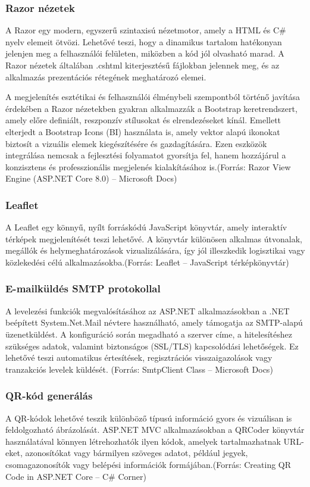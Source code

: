 \subsubsection{Razor nézetek}

\indent A Razor egy modern, egyszerű szintaxisú nézetmotor, amely a HTML és C\# nyelv elemeit ötvözi. Lehetővé teszi, hogy a dinamikus tartalom hatékonyan jelenjen meg a felhasználói felületen, miközben a kód jól olvasható marad. A Razor nézetek általában {.cshtml} kiterjesztésű fájlokban jelennek meg, és az alkalmazás prezentációs rétegének meghatározó elemei.

\indent A megjelenítés esztétikai és felhasználói élménybeli szempontból történő javítása érdekében a Razor nézetekben gyakran alkalmazzák a Bootstrap keretrendszert, amely előre definiált, reszponzív stílusokat és elrendezéseket kínál. Emellett elterjedt a Bootstrap Icons (BI) használata is, amely vektor alapú ikonokat biztosít a vizuális elemek kiegészítésére és gazdagítására. Ezen eszközök integrálása nemcsak a fejlesztési folyamatot gyorsítja fel, hanem hozzájárul a konzisztens és professzionális megjelenés kialakításához is.(Forrás: Razor View Engine (ASP.NET Core 8.0) – Microsoft Docs)


\subsubsection{Leaflet}

\indent A Leaflet egy könnyű, nyílt forráskódú JavaScript könyvtár, amely interaktív térképek megjelenítését teszi lehetővé. A könyvtár különösen alkalmas útvonalak, megállók és helymeghatározások vizualizálására, így jól illeszkedik logisztikai vagy közlekedési célú alkalmazásokba.(Forrás: Leaflet – JavaScript térképkönyvtár)

\subsubsection{E-mailküldés SMTP protokollal}

\indent A levelezési funkciók megvalósításához az ASP.NET alkalmazásokban a .NET beépített System.Net.Mail névtere használható, amely támogatja az SMTP-alapú üzenetküldést. A konfiguráció során megadható a szerver címe, a hitelesítéshez szükséges adatok, valamint biztonságos (SSL/TLS) kapcsolódási lehetőségek. Ez lehetővé teszi automatikus értesítések, regisztrációs visszaigazolások vagy tranzakciós levelek küldését. (Forrás: SmtpClient Class – Microsoft Docs)

\subsubsection{QR-kód generálás}

\indent A QR-kódok lehetővé teszik különböző típusú információ gyors és vizuálisan is feldolgozható ábrázolását. ASP.NET MVC alkalmazásokban a QRCoder könyvtár használatával könnyen létrehozhatók ilyen kódok, amelyek tartalmazhatnak URL-eket, azonosítókat vagy bármilyen szöveges adatot, például jegyek, csomagazonosítók vagy belépési információk formájában.(Forrás: Creating QR Code in ASP.NET Core – C\# Corner)
